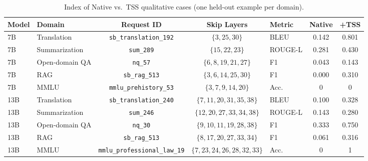 
\begin{table}[t]
\centering
\small
\caption{Index of Native vs.\ TSS qualitative cases (one held-out example per domain).}
\label{tab:tss_case_index}
\begin{tabular}{llcclcc}
\toprule
Model & Domain & Request ID & Skip Layers & Metric & Native & +TSS \\
\midrule
7B & Translation & \texttt{sb\_translation\_192} & $\{3,25,30\}$ & BLEU & 0.142 & 0.801 \\
7B & Summarization & \texttt{sum\_289} & $\{15,22,23\}$ & ROUGE-L & 0.281 & 0.430 \\
7B & Open-domain QA & \texttt{nq\_57} & $\{6,8,19,21,27\}$ & F1 & 0.043 & 0.143 \\
7B & RAG & \texttt{sb\_rag\_513} & $\{3,6,14,25,30\}$ & F1 & 0.000 & 0.310 \\
7B & MMLU & \texttt{mmlu\_prehistory\_53} & $\{3,7,9,14,20\}$ & Acc. & 0 & 0 \\
13B & Translation & \texttt{sb\_translation\_240} & $\{7,11,20,31,35,38\}$ & BLEU & 0.100 & 0.328 \\
13B & Summarization & \texttt{sum\_246} & $\{12,20,27,33,34,38\}$ & ROUGE-L & 0.143 & 0.280 \\
13B & Open-domain QA & \texttt{nq\_30} & $\{9,10,11,19,28,38\}$ & F1 & 0.333 & 0.750 \\
13B & RAG & \texttt{sb\_rag\_513} & $\{8,17,20,27,33,34\}$ & F1 & 0.061 & 0.316 \\
13B & MMLU & \texttt{mmlu\_professional\_law\_19} & $\{7,23,24,26,28,32,33\}$ & Acc. & 0 & 1 \\
\bottomrule
\end{tabular}
\end{table}

